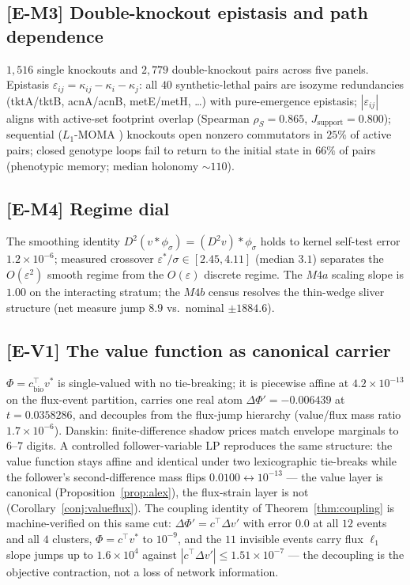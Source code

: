\documentclass[11pt,a4paper]{article}
\theoremstyle{plain}
\theoremstyle{definition}
\theoremstyle{remark}
\begin{document}
\subsection{[E-M3] Double-knockout epistasis and path dependence}
$1{,}516$ single knockouts and $2{,}779$ double-knockout pairs across five
panels. Epistasis $\varepsilon_{ij} = \kappa_{ij} - \kappa_i - \kappa_j$:
all $40$ synthetic-lethal pairs are isozyme redundancies
(tktA/tktB, acnA/acnB, metE/metH, \dots) with pure-emergence epistasis;
$|\varepsilon_{ij}|$ aligns with active-set footprint overlap
(Spearman $\rho_S = 0.865$, $J_{\mathrm{support}} = 0.800$); sequential
($L_1$-MOMA \citep{segre2002}) knockouts open nonzero commutators in $25\%$ of active pairs;
closed genotype loops fail to return to the initial state in $66\%$ of
pairs (phenotypic memory; median holonomy $\sim 110$).

\subsection{[E-M4] Regime dial}
\label{sec:m4}
The smoothing identity $D^2(v * \phi_\sigma) = (D^2 v) * \phi_\sigma$
holds to kernel self-test error $1.2 \times 10^{-6}$; measured crossover
$\varepsilon^*/\sigma \in [2.45, 4.11]$ (median $3.1$) separates the
$O(\varepsilon^2)$ smooth regime from the $O(\varepsilon)$ discrete
regime. The $M4a$ scaling slope is $1.00$ on the interacting stratum;
the $M4b$ census resolves the thin-wedge sliver structure
(net measure jump $8.9$ vs.\ nominal $\pm 1884.6$).

\subsection{[E-V1] The value function as canonical carrier}
$\Phi = c_{\mathrm{bio}}^\top v^*$ is single-valued with no tie-breaking;
it is piecewise affine at $4.2 \times 10^{-13}$ on the flux-event
partition, carries one real atom
$\Delta\Phi' = -0.006439$ at $t = 0.0358286$, and decouples from the
flux-jump hierarchy (value/flux mass ratio $1.7 \times 10^{-6}$).
Danskin: finite-difference shadow prices match envelope marginals to
$6$--$7$ digits. A controlled follower-variable LP reproduces the same
structure: the value function stays affine and identical under two
lexicographic tie-breaks while the follower's second-difference mass
flips $0.0100 \leftrightarrow 10^{-13}$ --- the value layer is
canonical (Proposition~\ref{prop:alex}), the flux-strain layer is not
(Corollary~\ref{conj:valueflux}). The coupling identity of
Theorem~\ref{thm:coupling} is machine-verified on this same cut:
$\Delta\Phi' = c^\top \Delta v'$ with error $0.0$ at all $12$
events and all $4$ clusters, $\Phi = c^\top v^*$ to $10^{-9}$, and
the $11$ invisible events carry flux $\ell_1$ slope jumps up to
$1.6 \times 10^{4}$ against $|c^\top \Delta v'| \le 1.51 \times
10^{-7}$ --- the decoupling is the objective contraction, not a loss
of network information.
\end{document}
